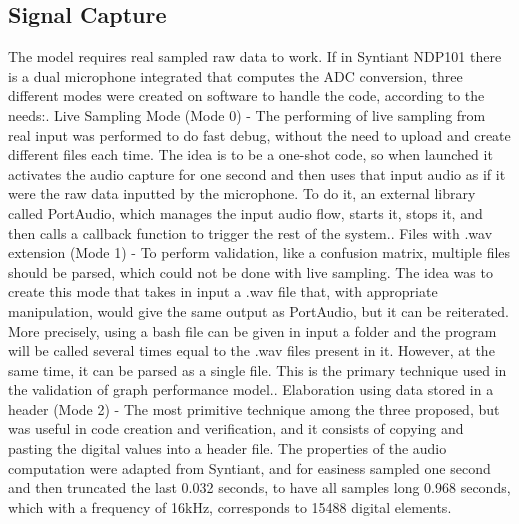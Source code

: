 \subsection{Signal Capture}
\label{subsec:signal}
The model requires real sampled raw data to work. If in Syntiant NDP101 there is a dual microphone integrated that computes the ADC conversion, three different modes were created on software to handle the code, according to the needs:\newline{}. Live Sampling Mode (Mode 0) - The performing of live sampling from real input was performed to do fast debug, without the need to upload and create different files each time. The idea is to be a one-shot code, so when launched it activates the audio capture for one second and then uses that input audio as if it were the raw data inputted by the microphone. To do it, an external library called PortAudio\cite{portaudio}, which manages the input audio flow, starts it, stops it, and then calls a callback function to trigger the rest of the system.. Files with .wav extension (Mode 1) - To perform validation, like a confusion matrix, multiple files should be parsed, which could not be done with live sampling. The idea was to create this mode that takes in input a .wav file that, with appropriate manipulation, would give the same output as PortAudio, but it can be reiterated. More precisely, using a bash file can be given in input a folder and the program will be called several times equal to the .wav files present in it. However, at the same time, it can be parsed as a single file. This is the primary technique used in the validation of graph performance model.. Elaboration using data stored in a header (Mode 2) - The most primitive technique among the three proposed, but was useful in code creation and verification, and it consists of copying and pasting the digital values into a header file.\newline\newline
The properties of the audio computation were adapted from Syntiant, and for easiness sampled one second and then truncated the last 0.032 seconds, to have all samples long 0.968 seconds, which with a frequency of 16kHz, corresponds to 15488 digital elements.

